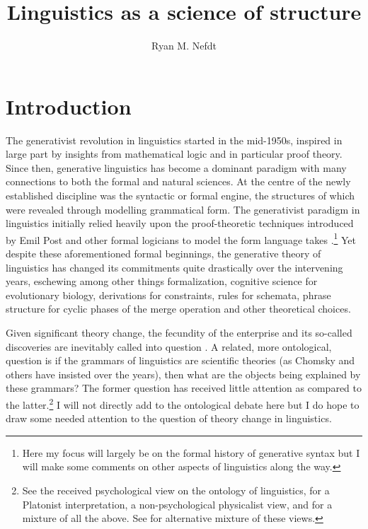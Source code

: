 \documentclass[output=paper]{langscibook}
\title{Linguistics as a science of structure}
\author{Ryan M. Nefdt \affiliation{University of the Western Cape}}
\begin{document}
\maketitle

\section{Introduction}
\label{sec:nefdt:intro}

The generativist revolution in linguistics started in the mid-1950s, inspired in large part by insights from mathematical logic and in particular proof theory. Since then, generative linguistics has become a dominant paradigm with many connections to both the formal and natural sciences. At the centre of the newly established discipline was the syntactic or formal engine, the structures of which were revealed through modelling grammatical form. The generativist paradigm in linguistics initially relied heavily upon the proof-theoretic techniques introduced by Emil Post and other formal logicians to model the form language takes \citep{Tomalin2006, Pullum2011, Pullum2013}.\footnote{Here my focus will largely be on the formal history of generative syntax but I will make some comments on other aspects of linguistics along the way.} Yet despite these aforementioned formal beginnings, the generative theory of linguistics has changed its commitments quite drastically over the intervening years, eschewing among other things formalization, cognitive science for evolutionary biology, derivations for constraints, rules for schemata, phrase structure for cyclic phases of the merge operation and other theoretical choices.  

Given significant theory change, the fecundity of the enterprise and its so-called discoveries are inevitably called into question \citep{Stokhof2011,Lappin2000,Jackendoff2002}. A related, more ontological, question is if the grammars of linguistics are scientific theories (as Chomsky and others have insisted over the years), then what are the objects being explained by these grammars? The former question has received little attention as compared to the latter.\footnote {See \cite{Chomsky1986} the received psychological view on the ontology of linguistics, \cite{Katz1991} for a Platonist interpretation, \cite{Devitt2006} a non-psychological physicalist view, and \cite{Stainton2014} for a mixture of all the above. See \cite{Nefdt:2018} for alternative mixture of these views.} I will not directly add to the ontological debate here but I do hope to draw some needed attention to the question of theory change in linguistics. 
\end{document}
